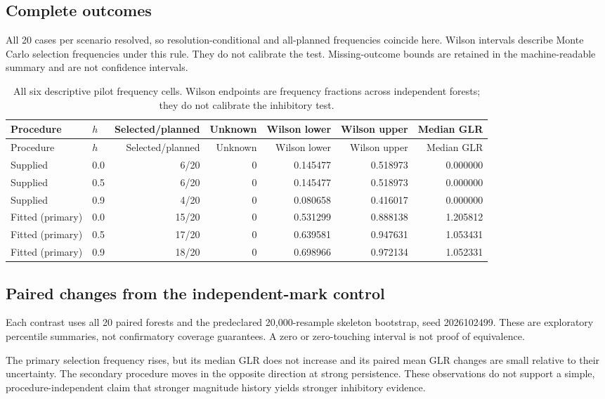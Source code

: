 \subsection{Complete outcomes}

All 20 cases per scenario resolved, so resolution-conditional and all-planned frequencies coincide here. Wilson intervals describe Monte Carlo selection frequencies under this rule. They do not calibrate the test. Missing-outcome bounds are retained in the machine-readable summary and are not confidence intervals.
{\small
\setlength{\tabcolsep}{3pt}
\begin{longtable}{llrrrrr}
\caption{All six descriptive pilot frequency cells. Wilson endpoints are frequency fractions across independent forests; they do not calibrate the inhibitory test.}\label{tab:pilot-frequency}\\
\toprule
Procedure & $h$ & Selected/planned & Unknown & Wilson lower & Wilson upper & Median GLR\\\midrule
\endfirsthead
\toprule
Procedure & $h$ & Selected/planned & Unknown & Wilson lower & Wilson upper & Median GLR\\\midrule
\endhead
Supplied & 0.0 & 6/20 & 0 & 0.145477 & 0.518973 & 0.000000\\
Supplied & 0.5 & 6/20 & 0 & 0.145477 & 0.518973 & 0.000000\\
Supplied & 0.9 & 4/20 & 0 & 0.080658 & 0.416017 & 0.000000\\
Fitted (primary) & 0.0 & 15/20 & 0 & 0.531299 & 0.888138 & 1.205812\\
Fitted (primary) & 0.5 & 17/20 & 0 & 0.639581 & 0.947631 & 1.053431\\
Fitted (primary) & 0.9 & 18/20 & 0 & 0.698966 & 0.972134 & 1.052331\\
\bottomrule
\end{longtable}
}

\subsection{Paired changes from the independent-mark control}

Each contrast uses all 20 paired forests and the predeclared 20,000-resample skeleton bootstrap, seed 2026102499. These are exploratory percentile summaries, not confirmatory coverage guarantees. A zero or zero-touching interval is not proof of equivalence.

The primary selection frequency rises, but its median GLR does not increase and its paired mean GLR changes are small relative to their uncertainty. The secondary procedure moves in the opposite direction at strong persistence. These observations do not support a simple, procedure-independent claim that stronger magnitude history yields stronger inhibitory evidence.

